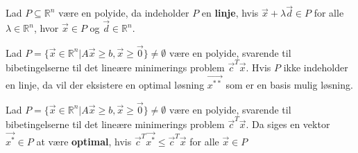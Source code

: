 \begin{defn}[Linje]
Lad $P\subseteq \mathds{R}^n $ være en polyide, da indeholder $P$ en \textbf{linje}, hvis $\vec{x}+\lambda\vec{d} \in P$ for alle $\lambda \in \mathds{R}^n$, hvor $\vec{x}\in P$ og $\vec{d} \in \mathds{R}^n$.
\end{defn}

\begin{stn}
Lad $P=\{\vec{x} \in \mathds{R}^n| A \vec{x} \geq b, \vec{x} \geq \vec{0}\} \neq \emptyset$ være en polyide, svarende til bibetingelserne til det lineære minimerings problem $\vec{c}^T\vec{x}$. Hvis $P$ ikke indeholder en linje, da vil der eksistere en optimal løsning $\vec{x^{**}}$ som er en basis mulig løsning.
\end{stn}

\begin{defn}
Lad $P=\{\vec{x} \in \mathds{R}^n| A \vec{x} \geq b, \vec{x} \geq \vec{0}\} \neq \emptyset$ være en polyide, svarende til bibetingelserne til det lineære minimerings problem $\vec{c}^T\vec{x}$.
Da siges en vektor $\vec{x^*}\in P$ at være \textbf{optimal}, hvis $\vec{c}^T\vec{x^*}\leq \vec{c}^T\vec{x}$ for alle $\vec{x}\in P$
\end{defn}

